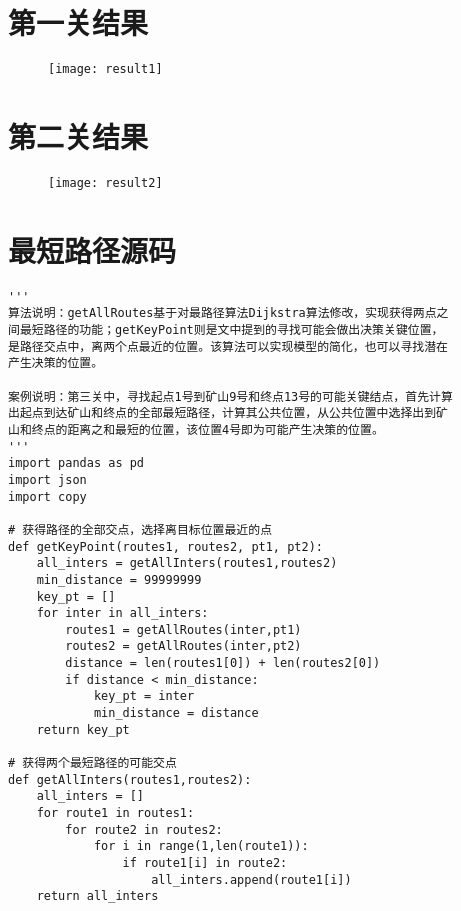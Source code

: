 \documentclass[bwprint]{cumcmthesis} %
\begin{document}
\newpage

\newpage
\begin{appendices}

\section{第一关结果}
    
\begin{figure}[!h]
    \centering
    \texttt{[image: result1]}
    \label{fig:result1}
\end{figure}
    
\newpage

\section{第二关结果}
    
\begin{figure}[!h]
    \centering
    \texttt{[image: result2]}
    \label{fig:result2}
\end{figure}
    
\newpage

\section{最短路径源码}

\begin{lstlisting}
'''
算法说明：getAllRoutes基于对最路径算法Dijkstra算法修改，实现获得两点之
间最短路径的功能；getKeyPoint则是文中提到的寻找可能会做出决策关键位置，
是路径交点中，离两个点最近的位置。该算法可以实现模型的简化，也可以寻找潜在
产生决策的位置。
    
案例说明：第三关中，寻找起点1号到矿山9号和终点13号的可能关键结点，首先计算
出起点到达矿山和终点的全部最短路径，计算其公共位置，从公共位置中选择出到矿
山和终点的距离之和最短的位置，该位置4号即为可能产生决策的位置。
'''
import pandas as pd
import json
import copy
    
# 获得路径的全部交点，选择离目标位置最近的点
def getKeyPoint(routes1, routes2, pt1, pt2):
    all_inters = getAllInters(routes1,routes2)
    min_distance = 99999999
    key_pt = []
    for inter in all_inters:
        routes1 = getAllRoutes(inter,pt1)
        routes2 = getAllRoutes(inter,pt2)
        distance = len(routes1[0]) + len(routes2[0])
        if distance < min_distance:
            key_pt = inter
            min_distance = distance
    return key_pt
        
# 获得两个最短路径的可能交点
def getAllInters(routes1,routes2):
    all_inters = []
    for route1 in routes1:
        for route2 in routes2:
            for i in range(1,len(route1)):
                if route1[i] in route2:
                    all_inters.append(route1[i])
    return all_inters
    

\end{lstlisting}
\end{appendices}
\end{document}
